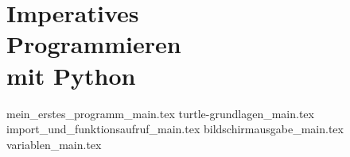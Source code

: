 
\part[Imperatives Programmieren mit Python]{Imperatives \\ Programmieren \\ mit Python}
\label{part-programmieren-mit-python}

{mein_erstes_programm_main.tex}
{turtle-grundlagen_main.tex}
{import_und_funktionsaufruf_main.tex}
{bildschirmausgabe_main.tex}
{variablen_main.tex}

